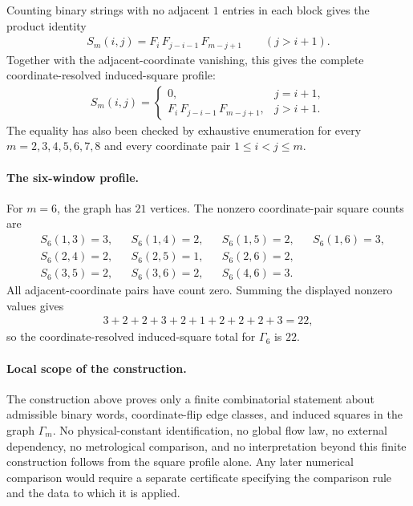 Counting binary strings with no adjacent $1$ entries in each block gives the product identity
$$
\begin{aligned}
S_m(i,j)=F_i\,F_{j-i-1}\,F_{m-j+1}\qquad (j>i+1).
\end{aligned}
$$
Together with the adjacent-coordinate vanishing, this gives the complete coordinate-resolved induced-square profile:
$$
\begin{aligned}
S_m(i,j)=
\begin{cases}
0, & j=i+1,\\
F_i\,F_{j-i-1}\,F_{m-j+1}, & j>i+1.
\end{cases}
\end{aligned}
$$
The equality has also been checked by exhaustive enumeration for every $m=2,3,4,5,6,7,8$ and every coordinate pair $1\leq i<j\leq m$.

\paragraph{The six-window profile.}
For $m=6$, the graph has $21$ vertices. The nonzero coordinate-pair square counts are
$$
\begin{aligned}
&S_6(1,3)=3,
&&S_6(1,4)=2,
&&S_6(1,5)=2,
&&S_6(1,6)=3,\\
&S_6(2,4)=2,
&&S_6(2,5)=1,
&&S_6(2,6)=2,\\
&S_6(3,5)=2,
&&S_6(3,6)=2,
&&S_6(4,6)=3.
\end{aligned}
$$
All adjacent-coordinate pairs have count zero. Summing the displayed nonzero values gives
$$
\begin{aligned}
3+2+2+3+2+1+2+2+2+3=22,
\end{aligned}
$$
so the coordinate-resolved induced-square total for $\Gamma_6$ is $22$.

\paragraph{Local scope of the construction.}
The construction above proves only a finite combinatorial statement about admissible binary words, coordinate-flip edge classes, and induced squares in the graph $\Gamma_m$. No physical-constant identification, no global flow law, no external dependency, no metrological comparison, and no interpretation beyond this finite construction follows from the square profile alone. Any later numerical comparison would require a separate certificate specifying the comparison rule and the data to which it is applied.

